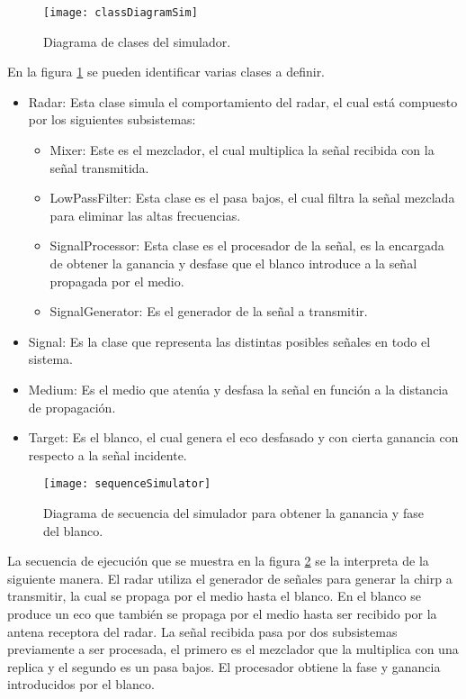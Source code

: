 \begin{figure}[H]
 \centering
 \texttt{[image: classDiagramSim]}
 \caption{Diagrama de clases del simulador.}
 \label{fig:classDiagramSimulator}
\end{figure}
En la figura \ref{fig:classDiagramSimulator} se pueden identificar varias clases a definir.
\begin{itemize}
  \item Radar: Esta clase simula el comportamiento del radar, el cual está compuesto por los siguientes subsistemas:
  \begin{itemize}
    \item Mixer: Este es el mezclador, el cual multiplica la señal recibida con la señal transmitida.
    \item LowPassFilter: Esta clase es el pasa bajos, el cual filtra la señal mezclada para eliminar las altas frecuencias.
    \item SignalProcessor: Esta clase es el procesador de la señal, es la encargada de obtener la ganancia y desfase que el blanco introduce a la señal propagada por el medio.
    \item SignalGenerator: Es el generador de la señal a transmitir.
  \end{itemize}

  \item Signal: Es la clase que representa las distintas posibles señales en todo el sistema.
  \item Medium: Es el medio que atenúa y desfasa la señal en función a la distancia de propagación.
  \item Target: Es el blanco, el cual genera el eco desfasado y con cierta ganancia con respecto a la señal incidente.
\end{itemize}

\begin{figure}[htb]
 \centering
 \texttt{[image: sequenceSimulator]}
 \caption{Diagrama de secuencia del simulador para obtener la ganancia y fase del blanco.}
 \label{fig:sequenceSimulator}
\end{figure}
La secuencia de ejecución que se muestra en la figura \ref{fig:sequenceSimulator} se la interpreta de la siguiente manera. El radar utiliza el generador de señales para generar la chirp a transmitir, la cual se propaga por el medio hasta el blanco. En el blanco se produce un eco que también se propaga por el medio hasta ser recibido por la antena receptora del radar. La señal recibida pasa por dos subsistemas previamente a ser procesada, el primero es el mezclador que la multiplica con una replica y el segundo es un pasa bajos. El procesador obtiene la fase y ganancia introducidos por el blanco.

